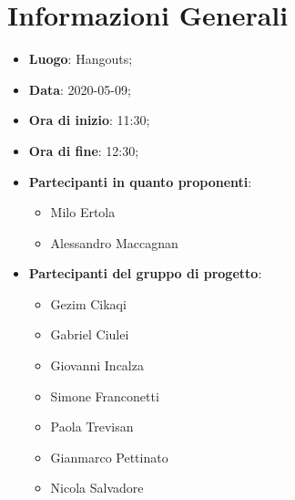 \section{Informazioni Generali}
	\begin{itemize}
		\item \textbf {Luogo}: Hangouts;
		\item \textbf {Data}: 2020-05-09;
		\item \textbf {Ora di inizio}: 11:30;
		\item \textbf {Ora di fine}: 12:30;
		\item \textbf {Partecipanti in quanto proponenti}:
		  \begin{itemize}
		    \item Milo Ertola
		    \item Alessandro Maccagnan
		  \end{itemize}
		\item \textbf {Partecipanti del gruppo di progetto}:
			\begin{itemize}
				\item Gezim Cikaqi
				\item Gabriel Ciulei
				\item Giovanni Incalza
				\item Simone Franconetti
				\item Paola Trevisan
				\item Gianmarco Pettinato
				\item Nicola Salvadore
			\end{itemize}
	\end{itemize}
